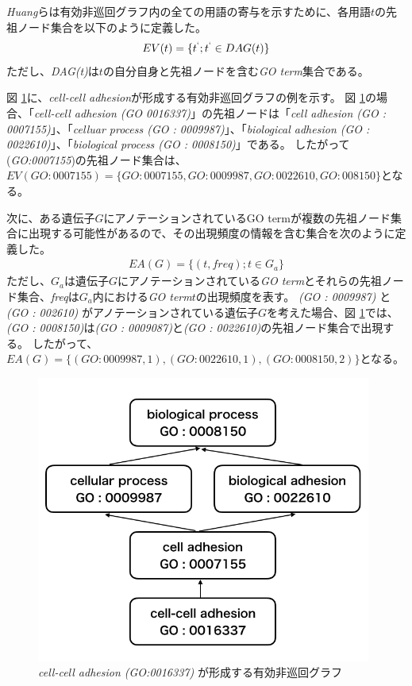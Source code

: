 \documentclass[titlepage,12pt]{jreport}
\begin{document}
{\it Huang}らは有効非巡回グラフ内の全ての用語の寄与を示すために、各用語$t$の先祖ノード集合を以下のように定義した。
\begin{eqnarray}
	EV(t) = \{t^{`} ; t^{`} \in DAG(t)\}
	\label{eq:EV}
\end{eqnarray}
ただし、{\it DAG(t)}は$t$の自分自身と先祖ノードを含む{\it GO term}集合である。

図 \ref{fig:go-dag}に、{\it cell-cell adhesion}が形成する有効非巡回グラフの例を示す。 図 \ref{fig:go-dag}の場合、「{\it cell-cell adhesion (GO 0016337)}」の先祖ノードは「{\it cell adhesion (GO : 0007155)}」、「{\it celluar process (GO : 0009987)}」、「{\it biological adhesion (GO : 0022610)}」、「{\it biological process (GO : 0008150)}」である。 したがって({\it GO:0007155})の先祖ノード集合は、$EV(GO:0007155) = \{GO : 0007155, GO : 0009987, GO : 0022610, GO : 008150\}$となる。

次に、ある遺伝子$G$にアノテーションされているGO termが複数の先祖ノード集合に出現する可能性があるので、その出現頻度の情報を含む集合を次のように定義した。
\begin{eqnarray}
	EA(G) = \{(t, freq) ; t \in G_a\}
	\label{eq:EA}
\end{eqnarray}
ただし、$G_a$は遺伝子$G$にアノテーションされている{\it GO term}とそれらの先祖ノード集合、{\it freq}は$G_a$内における{\it GO term}$t$の出現頻度を表す。 {\it (GO : 0009987)} と {\it (GO : 002610)} がアノテーションされている遺伝子$G$を考えた場合、図 \ref{fig:go-dag}では、{\it (GO : 0008150)}は{\it (GO : 0009087)}と{\it (GO : 0022610)}の先祖ノード集合で出現する。 したがって、$EA(G) = \{(GO : 0009987, 1), (GO : 0022610, 1), (GO : 0008150, 2)\}$となる。

\begin{figure}[hbt]
	\centering
\includegraphics[width=11cm]{img/GO-tfidf.png}
	\caption{{\it cell-cell adhesion (GO:0016337)} が形成する有効非巡回グラフ}
	\label{fig:go-dag}
\end{figure}
\end{document}

